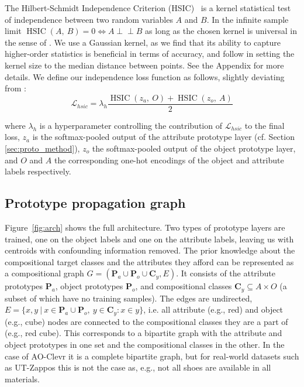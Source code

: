 \documentclass{article}
\begin{document}
The Hilbert-Schmidt Independence Criterion (HSIC)~\citep{gretton2007kernel} is a kernel statistical test of independence between two random variables $A$ and $B$. In the infinite sample limit $\operatorname{HSIC}(A,~B) = 0 \iff A \perp \!\!\! \perp  B$ as long as the chosen kernel is universal in the sense of \citet{steinwart2001influence}. We use a Gaussian kernel, as we find that its ability to
capture higher-order statistics is beneficial in terms of accuracy, and follow \citet{gretton2007kernel} in setting the kernel size to the median distance between points. See the Appendix for more details. We define our independence loss function as follows, slightly deviating from \citet{atzmon2020causal}:
\begin{equation}
\mathcal{L}_{hsic} = \lambda_h \frac{\operatorname{HSIC}(z_a,~O) + \operatorname{HSIC}(z_o,~A)}{2} 
\end{equation}

where $\lambda_h$ is a hyperparameter controlling the contribution of $\mathcal{L}_{hsic}$ to the final loss, $z_a$ is the softmax-pooled output of the attribute prototype layer (cf. Section \ref{sec:proto_method}), $z_o$ the softmax-pooled output of the object prototype layer, and $O$ and $A$ the corresponding one-hot encodings of the object and attribute labels respectively.

\subsection{Prototype propagation graph}

Figure~\ref{fig:arch} shows the full architecture. Two types of prototype layers are trained, one on the object labels and one on the attribute labels, leaving us with centroids with confounding information removed. The prior knowledge about the compositional target classes and the attributes they afford can be represented as a compositional graph $G = (\mathbf{P}_a \cup \mathbf{P}_o \cup \mathbf{C}_y, E)$. It consists of the attribute prototypes $\mathbf{P}_a$, object prototypes $\mathbf{P}_o$, and compositional classes $\mathbf{C}_y \subseteq A \times O$ (a subset of which have no training samples). The edges are undirected, $E = \{x, y~|~ x \in \mathbf{P}_a \cup \mathbf{P}_o,~ y \in \mathbf{C}_y : x \in y \}$, i.e. all attribute (e.g., red) and object (e.g., cube) nodes are connected to the compositional classes they are a part of (e.g., red cube). This corresponds to a bipartite graph with the attribute and object prototypes in one set and the compositional classes in the other. In the case of AO-Clevr it is a complete bipartite graph, but for real-world datasets such as UT-Zappos this is not the case as, e.g., not all shoes are available in all materials.
\end{document}
